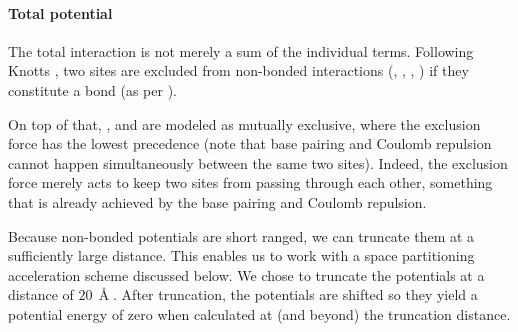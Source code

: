 \paragraph{Total potential}
The total interaction is not merely a sum of the individual terms.
Following Knotts \etal \cite{knotts2007coarse}, two sites are excluded from non-bonded interactions (\Vstck, \Vbp, \Vqq, \Vexcl) if they constitute a bond (as per \Vbond).

On top of that, \Vbp, \Vqq and \Vexcl are modeled as mutually exclusive, where the exclusion force has the lowest precedence (note that base pairing and Coulomb repulsion cannot happen simultaneously between the same two sites).
Indeed, the exclusion force merely acts to keep two sites from passing through each other, something that is already achieved by the base pairing and Coulomb repulsion.

Because non-bonded potentials are short ranged, we can truncate them at a sufficiently large distance.
This enables us to work with a space partitioning acceleration scheme discussed below.
We chose to truncate the potentials at a distance of $20\,\Angstrom$. After truncation, the potentials are shifted so they yield a potential energy of zero when calculated at (and beyond) the truncation distance.



